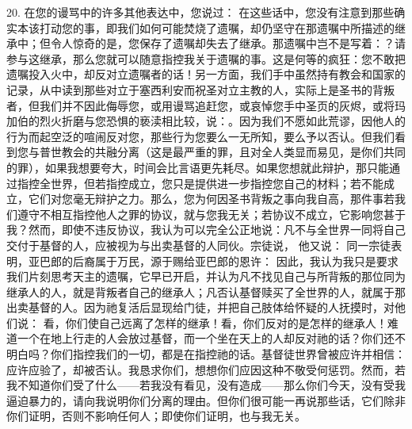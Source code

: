 20. 在您的谩骂中的许多其他表达中，您说过： 在这些话中，您没有注意到那些确实本该打动您的事，即我们如何可能焚烧了遗嘱，却仍坚守在那遗嘱中所描述的继承中；但令人惊奇的是，您保存了遗嘱却失去了继承。那遗嘱中岂不是写着：？请参与这继承，那么您就可以随意指控我关于遗嘱的事。这是何等的疯狂：您不敢把遗嘱投入火中，却反对立遗嘱者的话！另一方面，我们手中虽然持有教会和国家的记录，从中读到那些对立于塞西利安而祝圣对立主教的人，实际上是圣书的背叛者，但我们并不因此侮辱您，或用谩骂追赶您，或哀悼您手中圣页的灰烬，或将玛加伯的烈火折磨与您恐惧的亵渎相比较，说：。因为我们不愿如此荒谬，因他人的行为而起空泛的喧闹反对您，那些行为您要么一无所知，要么予以否认。但我们看到您与普世教会的共融分离（这是最严重的罪，且对全人类显而易见，是你们共同的罪），如果我想要夸大，时间会比言语更先耗尽。如果您想就此辩护，那只能通过指控全世界，但若指控成立，您只是提供进一步指控您自己的材料；若不能成立，它们对您毫无辩护之力。那么，您为何因圣书背叛之事向我自高，那件事若我们遵守不相互指控他人之罪的协议，就与您我无关；若协议不成立，它影响您甚于我？然而，即使不违反协议，我认为可以完全公正地说：凡不与全世界一同将自己交付于基督的人，应被视为与出卖基督的人同伙。宗徒说， 他又说： 同一宗徒表明，亚巴郎的后裔属于万民，源于赐给亚巴郎的恩许： 因此，我认为我只是要求我们片刻思考天主的遗嘱，它早已开启，并认为凡不找见自己与所背叛的那位同为继承人的人，就是背叛者自己的继承人；凡否认基督赎买了全世界的人，就属于那出卖基督的人。因为祂复活后显现给门徒，并把自己肢体给怀疑的人抚摸时，对他们说： 看，你们使自己远离了怎样的继承！看，你们反对的是怎样的继承人！难道一个在地上行走的人会放过基督，而一个坐在天上的人却反对祂的话？你们还不明白吗？你们指控我们的一切，都是在指控祂的话。基督徒世界曾被应许并相信：应许应验了，却被否认。我恳求你们，想想你们应因这种不敬受何惩罚。然而，若我不知道你们受了什么——若我没有看见，没有造成——那么你们今天，没有受我逼迫暴力的，请向我说明你们分离的理由。但你们很可能一再说那些话，它们除非你们证明，否则不影响任何人；即使你们证明，也与我无关。\par


